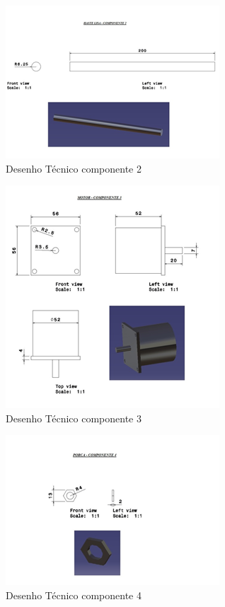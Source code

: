 \begin{apendicesenv}
\begin{figure}[H]
		\centering
			\includegraphics[scale=1.0]{figuras/tec2.png}
		\caption{Desenho Técnico componente 2}
		\label{tec2}
\end{figure}

\begin{figure}[H]
		\centering
			\includegraphics[scale=1.0]{figuras/tec3.png}
		\caption{Desenho Técnico componente 3}
		\label{tec3}
\end{figure}

\begin{figure}[H]
		\centering
			\includegraphics[scale=1.0]{figuras/tec4.png}
		\caption{Desenho Técnico componente 4}
		\label{tec4}
\end{figure}


\end{apendicesenv}
